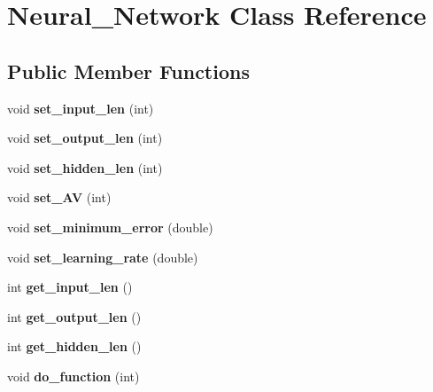 \hypertarget{classNeural__Network}{\section{Neural\-\_\-\-Network Class Reference}
\label{classNeural__Network}
}
\subsection*{Public Member Functions}
\begin{DoxyCompactItemize}
\item 
\hypertarget{classNeural__Network_afb37f8321b35bbc9b9beb88d56d69f08}{void {\bfseries set\-\_\-input\-\_\-len} (int)}\label{classNeural__Network_afb37f8321b35bbc9b9beb88d56d69f08}

\item 
\hypertarget{classNeural__Network_a695079279950a3eb27d62df68d32927c}{void {\bfseries set\-\_\-output\-\_\-len} (int)}\label{classNeural__Network_a695079279950a3eb27d62df68d32927c}

\item 
\hypertarget{classNeural__Network_ad1e1afff306e47947e23f4fdd4517e22}{void {\bfseries set\-\_\-hidden\-\_\-len} (int)}\label{classNeural__Network_ad1e1afff306e47947e23f4fdd4517e22}

\item 
\hypertarget{classNeural__Network_a80b2c577da9fdc4e830722e7a4569069}{void {\bfseries set\-\_\-\-A\-V} (int)}\label{classNeural__Network_a80b2c577da9fdc4e830722e7a4569069}

\item 
\hypertarget{classNeural__Network_a0458bfedabe1b42e4d30e3179bd1f189}{void {\bfseries set\-\_\-minimum\-\_\-error} (double)}\label{classNeural__Network_a0458bfedabe1b42e4d30e3179bd1f189}

\item 
\hypertarget{classNeural__Network_a87a3c876501fcd89ffc1caf298fa2703}{void {\bfseries set\-\_\-learning\-\_\-rate} (double)}\label{classNeural__Network_a87a3c876501fcd89ffc1caf298fa2703}

\item 
\hypertarget{classNeural__Network_a75e25e607afb4e862219b21c0569c893}{int {\bfseries get\-\_\-input\-\_\-len} ()}\label{classNeural__Network_a75e25e607afb4e862219b21c0569c893}

\item 
\hypertarget{classNeural__Network_a895c1b35110b7ee5e5adc56a63a55e78}{int {\bfseries get\-\_\-output\-\_\-len} ()}\label{classNeural__Network_a895c1b35110b7ee5e5adc56a63a55e78}

\item 
\hypertarget{classNeural__Network_ac781308fb521309d657b91a95054be52}{int {\bfseries get\-\_\-hidden\-\_\-len} ()}\label{classNeural__Network_ac781308fb521309d657b91a95054be52}

\item 
\hypertarget{classNeural__Network_acd3d4762d71d54422b45fda3a13976cf}{void {\bfseries do\-\_\-function} (int)}\label{classNeural__Network_acd3d4762d71d54422b45fda3a13976cf}

\end{DoxyCompactItemize}
